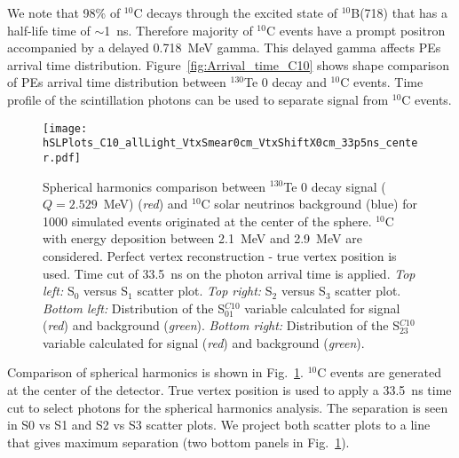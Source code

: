 We note that 98\% of $^{10}$C decays through the excited state of
$^{10}$B(718) that has a half-life time of $\sim$1~ns. Therefore
majority of $^{10}$C events have a prompt positron accompanied by a
delayed 0.718~MeV gamma. This delayed gamma affects PEs arrival time
distribution. Figure~\ref{fig:Arrival_time_C10} shows shape comparison
of PEs arrival time distribution between $^{130}$Te 0{\nbb} decay and
$^{10}$C events. Time profile of the scintillation photons can be used
to separate signal from $^{10}$C events.


\begin{figure}[h]
  \centering
  \texttt{[image: hSLPlots\_C10\_allLight\_VtxSmear0cm\_VtxShiftX0cm\_33p5ns\_center.pdf]}
  \caption{Spherical harmonics comparison between $^{130}$Te 0{\nbb}
    decay signal ($Q=2.529$~MeV) (\emph{red}) and $^{10}$C solar
    neutrinos background (blue) for 1000 simulated events originated
    at the center of the sphere. $^{10}$C with energy deposition
    between 2.1~MeV and 2.9~MeV are considered. Perfect vertex
    reconstruction - true vertex position is used. Time cut of 33.5~ns
    on the photon arrival time is applied. \emph{Top left:} S$_0$
    versus S$_1$ scatter plot. \emph{Top right:} S$_2$ versus S$_3$
    scatter plot. \emph{Bottom left:} Distribution of the
    S$^{C10}_{01}$ variable calculated for signal (\emph{red}) and
    background (\emph{green}). \emph{Bottom right:} Distribution of
    the S$^{C10}_{23}$ variable calculated for signal (\emph{red}) and
    background (\emph{green}).}
  \label{fig:SL_C10_33p5ns_center}
\end{figure}


Comparison of spherical harmonics is shown in
Fig.~\ref{fig:SL_C10_33p5ns_center}. $^{10}$C events are generated at
the center of the detector. True vertex position is used to apply a
33.5~ns time cut to select photons for the spherical harmonics
analysis. The separation is seen in S0 vs S1 and S2 vs S3 scatter
plots. We project both scatter plots to a line that gives maximum
separation (two bottom panels in Fig.~\ref{fig:SL_C10_33p5ns_center}).

